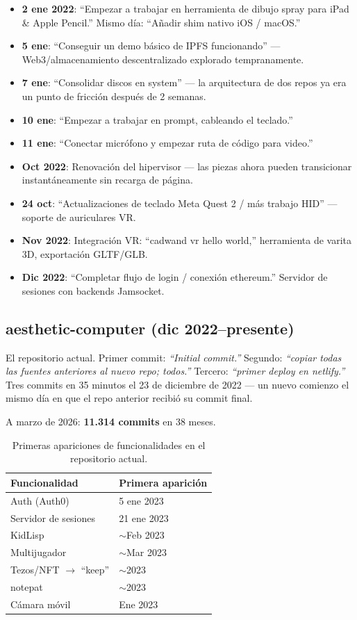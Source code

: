 \documentclass[10pt,letterpaper,twocolumn]{article}
\begin{document}
\begin{itemize}
  \item \textbf{2 ene 2022}: ``Empezar a trabajar en herramienta de dibujo spray para iPad \& Apple Pencil.'' Mismo día: ``Añadir shim nativo iOS / macOS.''
  \item \textbf{5 ene}: ``Conseguir un demo básico de IPFS funcionando'' --- Web3/almacenamiento descentralizado explorado tempranamente.
  \item \textbf{7 ene}: ``Consolidar discos en system'' --- la arquitectura de dos repos ya era un punto de fricción después de 2 semanas.
  \item \textbf{10 ene}: ``Empezar a trabajar en prompt, cableando el teclado.''
  \item \textbf{11 ene}: ``Conectar micrófono y empezar ruta de código para video.''
  \item \textbf{Oct 2022}: Renovación del hipervisor --- las piezas ahora pueden transicionar instantáneamente sin recarga de página.
  \item \textbf{24 oct}: ``Actualizaciones de teclado Meta Quest 2 / más trabajo HID'' --- soporte de auriculares VR.
  \item \textbf{Nov 2022}: Integración VR: ``cadwand vr hello world,'' herramienta de varita 3D, exportación GLTF/GLB.
  \item \textbf{Dic 2022}: ``Completar flujo de login / conexión ethereum.'' Servidor de sesiones con backends Jamsocket.
\end{itemize}

\subsection{aesthetic-computer (dic 2022--presente)}

El repositorio actual. Primer commit: \emph{``Initial commit.''} Segundo: \emph{``copiar todas las fuentes anteriores al nuevo repo; todos.''} Tercero: \emph{``primer deploy en netlify.''} Tres commits en 35 minutos el 23 de diciembre de 2022 --- un nuevo comienzo el mismo día en que el repo anterior recibió su commit final.

A marzo de 2026: \textbf{11.314 commits} en 38 meses.

\begin{table}[h]
\small
\centering
\begin{tabular}{ll}
\toprule
\textbf{Funcionalidad} & \textbf{Primera aparición} \\
\midrule
Auth (Auth0) & 5 ene 2023 \\
Servidor de sesiones & 21 ene 2023 \\
KidLisp & $\sim$Feb 2023 \\
Multijugador & $\sim$Mar 2023 \\
Tezos/NFT $\rightarrow$ ``keep'' & $\sim$2023 \\
notepat & $\sim$2023 \\
Cámara móvil & Ene 2023 \\
\bottomrule
\end{tabular}
\caption{Primeras apariciones de funcionalidades en el repositorio actual.}
\end{table}
\end{document}
